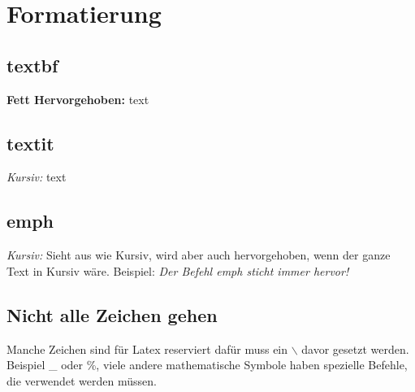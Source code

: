 \chapter{Formatierung}
\section{textbf}
\textbf{Fett Hervorgehoben:} text

\section{textit}
\textit{Kursiv:} text

\section{emph}
\emph{Kursiv:} Sieht aus wie Kursiv, wird aber auch hervorgehoben, wenn der ganze Text in Kursiv wäre. Beispiel: \textit{Der Befehl \emph{emph} sticht immer hervor!}

\section{Nicht alle Zeichen gehen}
Manche Zeichen sind für Latex reserviert dafür muss ein \(\backslash\) davor gesetzt werden. Beispiel \_ oder \%, viele andere mathematische Symbole haben spezielle Befehle, die verwendet werden müssen.